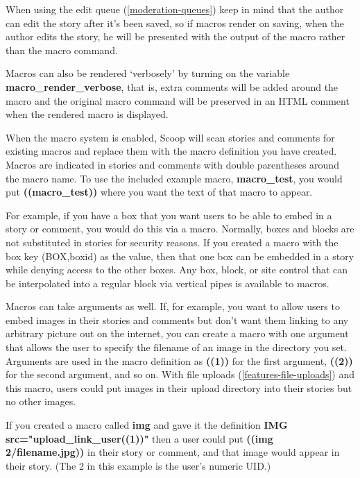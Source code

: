 When using the edit queue (\ref{moderation-queues}) keep in mind that the author can edit the story after it's been saved, so if macros render on saving, when the author edits the story, he will be presented with the output of the macro rather than the macro command.

Macros can also be rendered `verbosely' by turning on the variable {\bf macro\_render\_verbose}, that is, extra comments will be added around the macro and the original macro command will be preserved in an HTML comment when the rendered macro is displayed.

When the macro system is enabled, Scoop will scan stories and comments for existing macros and replace them with the macro definition you have created. Macros are indicated in stories and comments with double parentheses around the macro name. To use the included example macro, {\bf macro\_test}, you would put {\bf ((macro\_test))} where you want the text of that macro to appear.

For example, if you have a box that you want users to be able to embed in a story or comment, you would do this via a macro. Normally, boxes and blocks are not substituted in stories for security reasons. If you created a macro with the box key (\latexhtml{$\vert$}{|}BOX,boxid\latexhtml{$\vert$}{|}) as the value, then that one box can be embedded in a story while denying access to the other boxes. Any box, block, or site control that can be interpolated into a regular block via vertical pipes is available to macros.

Macros can take arguments as well. If, for example, you want to allow users to embed images in their stories and comments but don't want them linking to any arbitrary picture out on the internet, you can create a macro with one argument that allows the user to specify the filename of an image in the directory you set. Arguments are used in the macro definition as {\bf ((1))} for the first argument, {\bf ((2))} for the second argument, and so on. With file uploads (\ref{features-file-uploads}) and this macro, users could put images in their upload directory into their stories but no other images.

If you created a macro called {\bf img} and gave it the definition {\bf \latexhtml{$<$}{<}IMG src="\latexhtml{$\vert$}{|}upload\_link\_user\latexhtml{$\vert$}{|}((1))"\latexhtml{$>$}{>}} then a user could put {\bf ((img 2/filename.jpg))} in their story or comment, and that image would appear in their story. (The 2 in this example is the user's numeric UID.)

